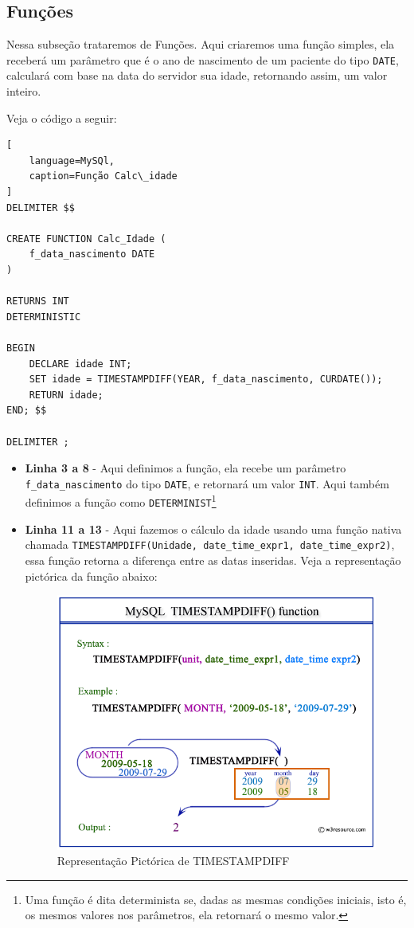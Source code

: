 \subsection{Funções}
Nessa subseção trataremos de Funções. Aqui criaremos uma função simples, ela receberá um parâmetro que é o ano de nascimento de um paciente do tipo \texttt{DATE}, calculará com base na data do servidor sua idade, retornando assim, um valor inteiro.

Veja o código a seguir:

\begin{lstlisting}[
    language=MySQl,
    caption=Função Calc\_idade
]
DELIMITER $$

CREATE FUNCTION Calc_Idade (
    f_data_nascimento DATE
)

RETURNS INT
DETERMINISTIC

BEGIN 
    DECLARE idade INT;
    SET idade = TIMESTAMPDIFF(YEAR, f_data_nascimento, CURDATE());
    RETURN idade;
END; $$

DELIMITER ;
\end{lstlisting}

\begin{itemize}
    \item \textbf{Linha 3 a 8} - Aqui definimos a função, ela recebe um parâmetro \texttt{f\_data\_nascimento} do tipo \texttt{DATE}, e retornará um valor \texttt{INT}. Aqui também definimos a função como \texttt{DETERMINIST}\footnote{Uma função é dita determinista se, dadas as mesmas condições iniciais, isto é, os mesmos valores nos parâmetros, ela retornará o mesmo valor\cite{MySQL_deterministic}.}
    \item \textbf{Linha 11 a 13} - Aqui fazemos o cálculo da idade usando uma função nativa chamada \texttt{TIMESTAMPDIFF(Unidade, date\_time\_expr1, date\_time\_expr2)}, essa função retorna a diferença entre as datas inseridas. Veja a representação pictórica da função abaixo:

    \begin{figure}[H]
        \centering
        \includegraphics[width=0.75\linewidth]{Text//Proc/TIMESTAMPDIFF.png}
        \caption{Representação Pictórica de TIMESTAMPDIFF\cite{timestamp}}
        \label{fig:placeholder}
    \end{figure}
\end{itemize}

